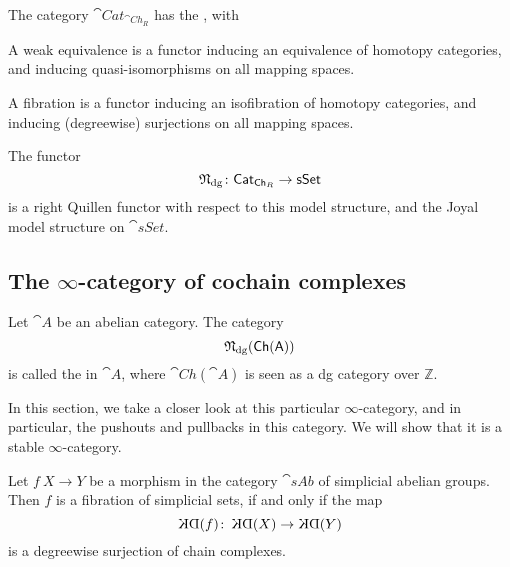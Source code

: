 \begin{theorem}
    The category $\cat{Cat}_{\cat{Ch}_R}$ has the , with
    \begin{itms}
        \item A weak equivalence is a functor inducing an equivalence of 
        homotopy categories, and inducing quasi-isomorphisms on all mapping spaces.
        \item A fibration is a functor inducing an isofibration of 
        homotopy categories, and inducing (degreewise) surjections on all mapping spaces.
    \end{itms}
    The functor
    \[\mathfrak{N}_{\mathrm{dg}}\colon\textup{\textsf{Cat}}_{\textup{\textsf{Ch}}_R}\to\textup{\textsf{sSet}}\]
    is a right Quillen functor with respect to this model structure,
    and the Joyal model structure on $\cat{sSet}$.
\end{theorem}

\subsection{The \texorpdfstring{$\infty$}{∞}-category of cochain complexes}

\begin{definition}
    Let $\cat{A}$ be an abelian category.
    The category \[\mathfrak{N}_{\mathrm{dg}}(\textup{\textsf{Ch}}(\textup{\textsf{A}}))\]
    is called the  in $\cat{A}$,
    where $\cat{Ch}(\cat{A})$ is seen as a dg category over $\mathbb{Z}$.
\end{definition}

In this section, we take a closer look at this particular $\infty$-category,
and in particular, the pushouts and pullbacks in this category.
We will show that it is a stable $\infty$-category.

\begin{proposition}\label{thm-9-k}
    Let $f\:X\to Y$ be a morphism in the category $\cat{sAb}$
    of simplicial abelian groups. Then $f$ is a fibration of simplicial sets,
    if and only if the map 
    \[\KD(f)\:\KD(X)\to\KD(Y)\]
    is a degreewise surjection of chain complexes.
\end{proposition}

